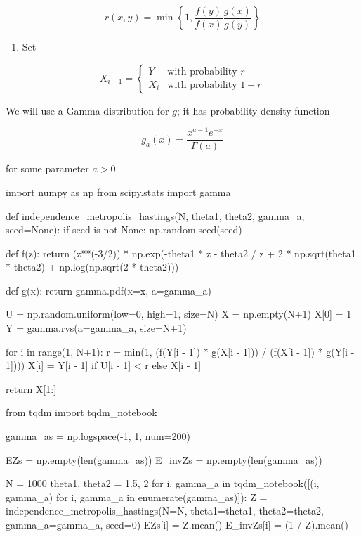 \[ r(x, y) = \min \left\{ 1, \frac{f(y)}{f(x)} \frac{g(x)}{g(y)} \right\} \]

\begin{enumerate}[tightlist,label={\arabic*.},resume]
\item
  Set
\end{enumerate}

\[
X_{i+1} = \begin{cases}
Y   &\text{with probability } r \\
X_i &\text{with probability } 1 - r 
\end{cases}
\]

We will use a Gamma distribution for \(g\); it has probability density
function

\[ g_a(x) = \frac{x^{a - 1} e^{-x}}{\Gamma(a)} \]

for some parameter \(a > 0\).

\begin{python}
import numpy as np
from scipy.stats import gamma

def independence_metropolis_hastings(N, theta1, theta2, gamma_a, seed=None):
    if seed is not None:
        np.random.seed(seed)
            
    def f(z):
        return (z**(-3/2)) * np.exp(-theta1 * z - theta2 / z + 2 * np.sqrt(theta1 * theta2) + np.log(np.sqrt(2 * theta2)))
        
    def g(x):
        return gamma.pdf(x=x, a=gamma_a)
    
    U = np.random.uniform(low=0, high=1, size=N)
    X = np.empty(N+1)
    X[0] = 1
    Y = gamma.rvs(a=gamma_a, size=N+1)
    
    for i in range(1, N+1):
        r = min(1, (f(Y[i - 1]) * g(X[i - 1])) / (f(X[i - 1]) * g(Y[i - 1])))
        X[i] = Y[i - 1] if U[i - 1] < r else X[i - 1]
        
    return X[1:]
\end{python}

\begin{python}
from tqdm import tqdm_notebook

gamma_as = np.logspace(-1, 1, num=200)

EZs = np.empty(len(gamma_as))
E_invZs = np.empty(len(gamma_as))

N = 1000
theta1, theta2 = 1.5, 2
for i, gamma_a in tqdm_notebook([(i, gamma_a) for i, gamma_a in enumerate(gamma_as)]):
    Z = independence_metropolis_hastings(N=N, theta1=theta1, theta2=theta2, gamma_a=gamma_a, seed=0)
    EZs[i] = Z.mean()
    E_invZs[i] = (1 / Z).mean()
\end{python}

